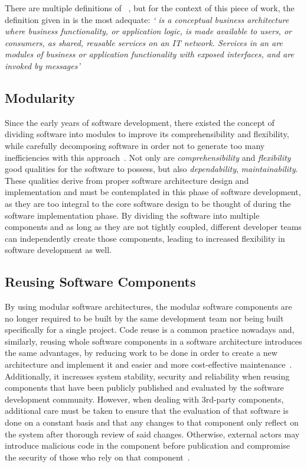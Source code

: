 There are multiple definitions of ~\Parencite{niknejad_ismail_ghani_nazari_bahari_hussin_2020}, but for the context of this piece of work, the definition given in \Parencite{marks2008service} is the most adequate:
\textit{` is a conceptual business architecture where business functionality, or application logic, is
made available to  users, or consumers, as shared, reusable services on an IT network. Services
in an  are modules of business or application functionality with exposed interfaces, and are
invoked by messages'}

\subsection{Modularity}\label{state-of-the-art:ss:modularity}

Since the early years of software development, there existed the concept of dividing software into modules to improve its comprehensibility and flexibility, while carefully decomposing software in order not to generate too many inefficiencies with this approach~\Parencite{parnas_1972}. Not only are \textit{comprehensibility} and \textit{flexibility} good qualities for the software to possess, but also \textit{dependability}, \textit{maintainability}. These qualities derive from proper software architecture design and implementation and must be contemplated in this phase of software development, as they are too integral to the core software design to be thought of during the software implementation phase. By dividing the software into multiple components and as long as they are not tightly coupled, different developer teams can independently create those components, leading to increased flexibility in software development as well.


\subsection{Reusing Software Components}\label{state-of-the-art:ss:reusing-software-components}

By using modular software architectures, the modular software components are no longer required to be built by the same development team nor being built specifically for a single project. 
Code reuse is a common practice nowadays and, similarly, reusing whole software components in a software architecture introduces the same advantages, by reducing work to be done in order to create a new architecture and implement it and easier and more cost-effective maintenance~\Parencite{hasselbring2018software}. Additionally, it increases system stability, security and reliability when reusing components that have been publicly published and evaluated by the software development community. However, when dealing with 3rd-party components, additional care must be taken to ensure that the evaluation of that software is done on a constant basis and that any changes to that component only reflect on the system after thorough review of said changes. Otherwise, external actors may introduce malicious code in the component before publication and compromise the security of those who rely on that component~\Parencite{tal_2022}.

